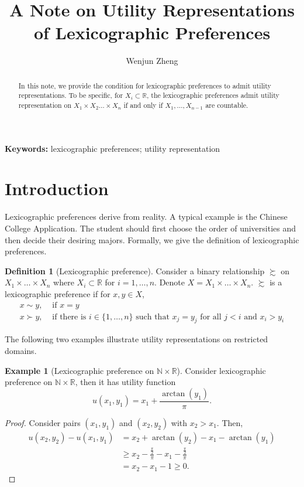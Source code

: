 \documentclass[a4paper, 12pt]{article}
\title{A Note on Utility Representations of Lexicographic Preferences}
\date{}
\author{Wenjun Zheng}
\theoremstyle{definition}
\newtheorem{example}{Example}
\newtheorem{definition}{Definition}
\begin{document}
\maketitle
\begin{abstract}
In this note, we provide the condition for lexicographic preferences to admit utility representations. To be specific, for $X_i\subset\mathbb{R}$, the lexicographic preferences admit utility representation on $X_1\times X_2\dots\times X_n$ if and only if $X_1,\dots,X_{n-1}$ are countable. 
\end{abstract}

\textbf{Keywords: }lexicographic preferences; utility representation

\section{Introduction}
Lexicographic preferences derive from reality. A typical example is the Chinese College Application. The student should first choose the order of universities and then decide their desiring majors. Formally, we give the definition of lexicographic preferences.

\begin{definition}[Lexicographic preference]
Consider a binary relationship $\succsim$ on $X_1\times\dots\times X_n$ where $X_i\subset\mathbb{R}$ for $i=1,\dots,n$. Denote $X=X_1\times\dots\times X_n$. $\succsim$ is a lexicographic preference if for $x,y\in X$, 
\begin{align*}
x\sim y,&\text{ if }x=y\\
x\succ y,&\text{ if there is $i\in\{1,\dots,n\}$ such that }x_j=y_j\text{ for all }j<i\text{ and }x_i>y_i
\end{align*}
\end{definition}

The following two examples illustrate utility representations on restricted domains.

\begin{example}[Lexicographic preference on $\mathbb{N}\times\mathbb{R}$]
Consider lexicographic preference on $\mathbb{N}\times\mathbb{R}$, then it has utility function
\[
u(x_1,y_1)=x_1+\frac{\arctan(y_1)}{\pi}.
\]
\begin{proof}
Consider pairs $(x_1,y_1)$ and $(x_2,y_2)$ with $x_2>x_1$. Then,
\begin{align*}
u(x_2,y_2)-u(x_1,y_1)&=x_2+\arctan(y_2)-x_1-\arctan(y_1)\\
&\geq x_2-\frac{\frac{\pi}{2}}{\pi}-x_1-\frac{\frac{\pi}{2}}{\pi}\\
&=x_2-x_1-1\geq 0.
\end{align*}
\end{proof}
\end{example}
\end{document}
